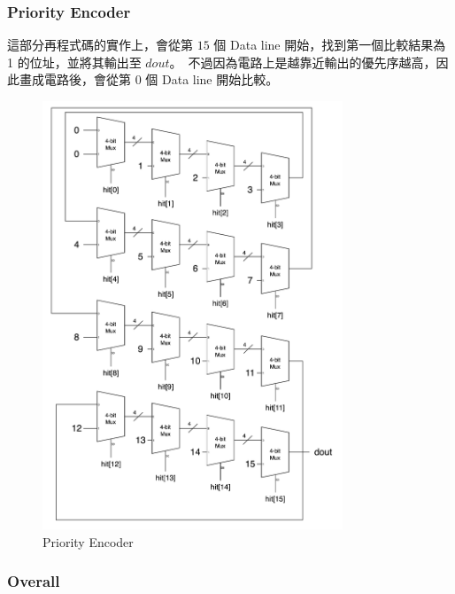 \documentclass[10.5pt,compsoc,UTF8]{CjC}
\theoremstyle{mystyle}
\begin{document}
\newpage
\subsubsection*{Priority Encoder}
這部分再程式碼的實作上，會從第 $15$ 個 Data line 開始，找到第一個比較結果為 1 的位址，並將其輸出至 $dout$。\
不過因為電路上是越靠近輸出的優先序越高，因此畫成電路後，會從第 $0$ 個 Data line 開始比較。

\begin{figure}[h!]
  \centering
  \includegraphics[width=0.8\textwidth]{./img/Q1-PE.png}
  \caption{Priority Encoder}
  \label{fig:PE}
\end{figure}
\newpage

\subsubsection*{Overall}
\end{document}
